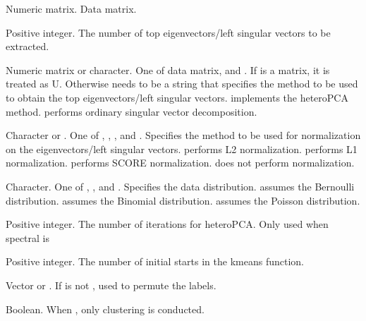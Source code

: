 \documentclass[a4paper]{book}
\begin{document}
\begin{Arguments}
\begin{ldescription}
\item[\code{R}] Numeric matrix. Data matrix.

\item[\code{K}] Positive integer. The number of top eigenvectors/left singular vectors to be extracted.

\item[\code{spectral}] Numeric matrix or character. One of data matrix,  and . 
If is a matrix, it is treated as U. Otherwise needs to be a string that 
specifies the method to be used to obtain the top  
eigenvectors/left singular vectors. 
 implements the heteroPCA method. 
 performs ordinary singular vector decomposition.

\item[\code{norm}] Character or . One of , , , and . 
Specifies the method to be used for normalization on the eigenvectors/left singular vectors. 
 performs L2 normalization. 
 performs L1 normalization.
 performs SCORE normalization.
 does not perform normalization.

\item[\code{dist}] Character. One of , , and . Specifies the data distribution.
 assumes the Bernoulli distribution.
 assumes the Binomial distribution.
 assumes the Poisson distribution.

\item[\code{T0}] Positive integer. The number of iterations for heteroPCA. Only used when spectral is 

\item[\code{nstart}] Positive integer. The number of initial starts in the kmeans function.

\item[\code{S0}] Vector or . If is not , used to permute the labels.

\item[\code{clustering\_only}] Boolean. When , only clustering is conducted.
\end{ldescription}
\end{Arguments}
%
\end{document}
